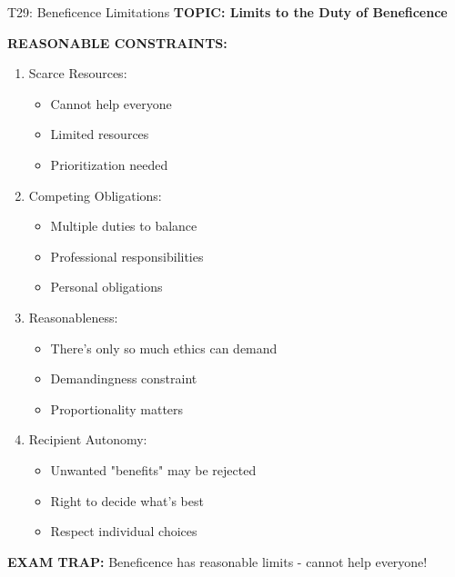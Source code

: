 \documentclass[8pt]{beamer}
\begin{document}
	\begin{frame}{T29: Beneficence Limitations}
		\fontsize{6.5}{7.5}\selectfont
		\textbf{TOPIC: Limits to the Duty of Beneficence}
		
		\vspace{0.1cm}
		\textbf{REASONABLE CONSTRAINTS:}
		\begin{enumerate}
			\item \textcolor{myblue}{Scarce Resources:}
			\begin{itemize}
				\item Cannot help everyone
				\item Limited resources
				\item Prioritization needed
			\end{itemize}
			\item \textcolor{myblue}{Competing Obligations:}
			\begin{itemize}
				\item Multiple duties to balance
				\item Professional responsibilities
				\item Personal obligations
			\end{itemize}
			\item \textcolor{myblue}{Reasonableness:}
			\begin{itemize}
				\item There's only so much ethics can demand
				\item Demandingness constraint
				\item Proportionality matters
			\end{itemize}
			\item \textcolor{myblue}{Recipient Autonomy:}
			\begin{itemize}
				\item Unwanted "benefits" may be rejected
				\item Right to decide what's best
				\item Respect individual choices
			\end{itemize}
		\end{enumerate}
		
		\textcolor{myred}{\textbf{EXAM TRAP:}} Beneficence has \textcolor{myblue}{reasonable limits} - cannot help everyone!
	\end{frame}
	
\end{document}
